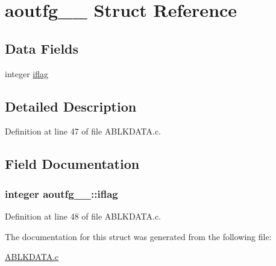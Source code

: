 \hypertarget{structaoutfg__1__}{}\section{aoutfg\+\_\+\_\+ Struct Reference}
\label{structaoutfg__1__}
\subsection*{Data Fields}
\begin{DoxyCompactItemize}
\item 
integer \hyperlink{structaoutfg__1___aa25eabb186a6ec32c09398949ce90425}{iflag}
\end{DoxyCompactItemize}


\subsection{Detailed Description}


Definition at line 47 of file A\+B\+L\+K\+D\+A\+T\+A.\+c.



\subsection{Field Documentation}
\subsubsection[{\texorpdfstring{iflag}{iflag}}]{\setlength{\rightskip}{0pt plus 5cm}integer aoutfg\+\_\+\_\+\+::iflag}\hypertarget{structaoutfg__1___aa25eabb186a6ec32c09398949ce90425}{}\label{structaoutfg__1___aa25eabb186a6ec32c09398949ce90425}


Definition at line 48 of file A\+B\+L\+K\+D\+A\+T\+A.\+c.



The documentation for this struct was generated from the following file\+:\begin{DoxyCompactItemize}
\item 
\hyperlink{ABLKDATA_8c}{A\+B\+L\+K\+D\+A\+T\+A.\+c}\end{DoxyCompactItemize}
